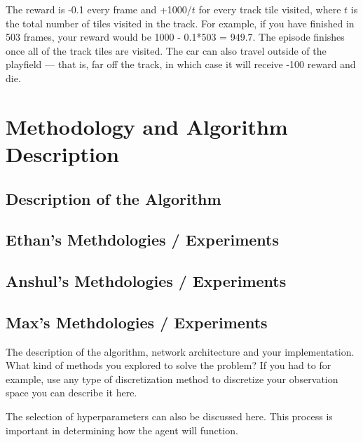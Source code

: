 \documentclass{article}
\begin{document}
The reward is -0.1 every frame and +1000/$t$ for every track tile visited, where $t$ is the total number of tiles visited in the track. For example, if you have finished in 503 frames, your reward would be 1000 - 0.1*503 = 949.7. The episode finishes once all of the track tiles are visited. The car can also travel outside of the playfield — that is, far off the track, in which case it will receive -100 reward and die.


\section{Methodology and Algorithm Description} 

\subsection{Description of the Algorithm}


\subsection{Ethan's Methdologies / Experiments}


\subsection{Anshul's Methdologies / Experiments}

\subsection{Max's Methdologies / Experiments}

The description of the algorithm, network architecture and your implementation. What kind of methods you explored to solve the problem? If you had to for example, use any type of discretization method to discretize your observation space you can describe it here.

The selection of hyperparameters can also be discussed here. This process is important in determining how the agent will function.

\end{document}

